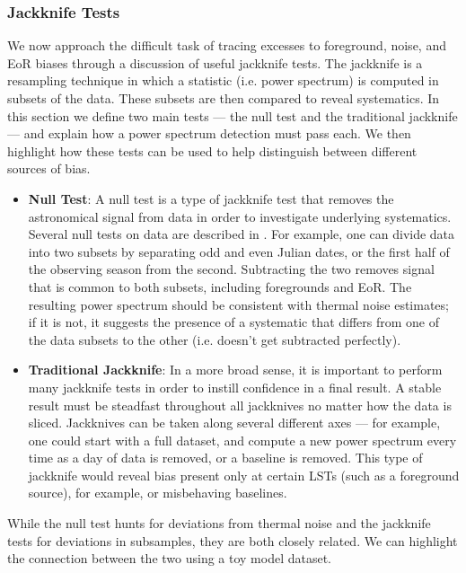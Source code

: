 \documentclass[preprint2,numberedappendix,tighten]{aastex6}  %
\begin{document}
\subsubsection{Jackknife Tests}
\label{sec:JackknifeOverview}

We now approach the difficult task of tracing excesses to foreground, noise, and EoR biases through a discussion of useful jackknife tests. The jackknife is a resampling technique in which a statistic (i.e. power spectrum) is computed in subsets of the data. These subsets are then compared to reveal systematics. In this section we define two main tests --- the null test and the traditional jackknife --- and explain how a power spectrum detection must pass each. We then highlight how these tests can be used to help distinguish between different sources of bias.
 
\begin{itemize}
\item \textbf{Null Test}: A null test is a type of jackknife test that removes the astronomical signal from data in order to investigate underlying systematics. Several null tests on data are described in \citet{keating_et_al2016}. For example, one can divide data into two subsets by separating odd and even Julian dates, or the first half of the observing season from the second. Subtracting the two removes signal that is common to both subsets, including foregrounds and EoR. The resulting power spectrum should be consistent with thermal noise estimates; if it is not, it suggests the presence of a systematic that differs from one of the data subsets to the other (i.e. doesn't get subtracted perfectly). 
\item \textbf{Traditional Jackknife}: In a more broad sense, it is important to perform many jackknife tests in order to instill confidence in a final result. A stable result must be steadfast throughout all jackknives no matter how the data is sliced. Jackknives can be taken along several different axes --- for example, one could start with a full dataset, and compute a new power spectrum every time as a day of data is removed, or a baseline is removed. This type of jackknife would reveal bias present only at certain LSTs (such as a foreground source), for example, or misbehaving baselines.
\end{itemize}

While the null test hunts for deviations from thermal noise and the jackknife tests for deviations in subsamples, they are both closely related. We can highlight the connection between the two using a toy model dataset.
\end{document}
